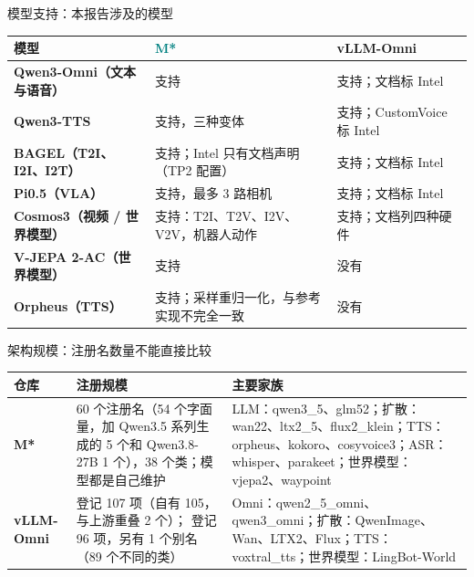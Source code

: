 \begin{frame}[t]{模型支持：本报告涉及的模型}
\scriptsize\def\codesize{\relax}
\renewcommand{\arraystretch}{1.12}
\setlength{\tabcolsep}{3pt}
\begin{tabularx}{\textwidth}{>{\bfseries}p{3.2cm} Y Y}
\toprule
{}
模型 & \textcolor{Teal}{M*} & vLLM-Omni \\
\midrule
Qwen3-Omni（文本与语音） & 支持 & 支持；文档标 Intel \\
Qwen3-TTS & 支持，三种变体 & 支持；CustomVoice 标 Intel \\
BAGEL（T2I、I2I、I2T） & 支持；Intel 只有文档声明（TP2 配置） & 支持；文档标 Intel \\
Pi0.5（VLA） & 支持，最多 3 路相机 & 支持；文档标 Intel \\
Cosmos3（视频 / 世界模型） & 支持：T2I、T2V、I2V、V2V，机器人动作 & 支持；文档列四种硬件 \\
V-JEPA 2-AC（世界模型） & 支持 & 没有 \\
Orpheus（TTS） & 支持；采样重归一化，与参考实现不完全一致 & 没有 \\
\bottomrule
\end{tabularx}
\end{frame}

\begin{frame}[t]{架构规模：注册名数量不能直接比较}
\scriptsize\def\codesize{\relax}
\renewcommand{\arraystretch}{1.12}
\setlength{\tabcolsep}{3pt}
\begin{tabularx}{\textwidth}{>{\bfseries}p{2.1cm} p{3.5cm} Y}
\toprule
{}
仓库 & 注册规模 & 主要家族 \\
\midrule
M* & 60 个注册名（54 个字面量，加 Qwen3.5 系列生成的 5 个和 Qwen3.8-27B 1 个），38 个类；模型都是自己维护 & LLM：qwen3\_5、glm52；扩散：wan22、ltx2\_5、flux2\_klein；TTS：orpheus、kokoro、cosyvoice3；ASR：whisper、parakeet；世界模型：vjepa2、waypoint \\
vLLM-Omni &  登记 107 项（自有 105，与上游重叠 2 个）； 登记 96 项，另有 1 个别名（89 个不同的类） & Omni：qwen2\_5\_omni、qwen3\_omni；扩散：QwenImage、Wan、LTX2、Flux；TTS：voxtral\_tts；世界模型：LingBot-World \\
\bottomrule
\end{tabularx}
\end{frame}
